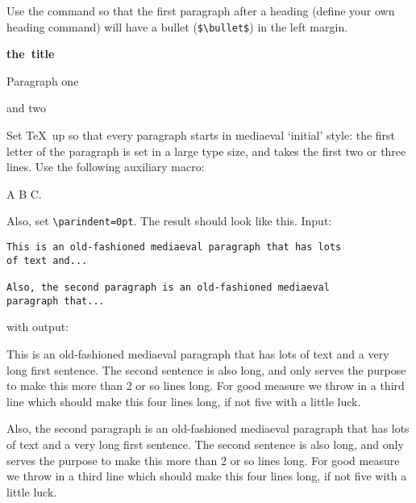 \begin{594exercise}
Use the  command so that the first paragraph after a
heading (define your own heading command) will have a bullet
(\verb+$\bullet$+) in the left margin.
\end{594exercise}
\begin{answer}
\begin{examplewithcode}
\def\Header#1{\medskip
  \hbox{\bfseries #1}
  \setcounter{vcount}{1}
  }
\Header{the title}

Paragraph one

and two
\end{examplewithcode}
\end{answer}


\begin{594exercise}
Set \TeX\ up so that every paragraph starts in mediaeval `initial'
style: the first letter of the paragraph is set in a large type size,
and takes the first two or three lines.
Use the following auxiliary macro:


\begin{examplewithcode}
A \Hang{$\bullet$} B  C. \bigskip
\end{examplewithcode}
Also, set \verb+\parindent=0pt+. The result should look like this. Input:
\begin{verbatim}
This is an old-fashioned mediaeval paragraph that has lots 
of text and...

Also, the second paragraph is an old-fashioned mediaeval
paragraph that...
\end{verbatim}
\smallskip with output:\par\medskip
\begin{minipage}{3in}
\def\biginitial#1{\hskip-20pt \Hang{\huge #1}\hskip 20pt}
\parindent=0pt
\everypar{\hangafter=-2 \hangindent=20pt \biginitial}
This is an old-fashioned mediaeval paragraph that has lots of text and
a very long first sentence. The second sentence is also long, and only
serves the purpose to make this more than 2 or so lines long. For good
measure we throw in a third line which should make this four lines
long, if not five with a little luck.

Also, the second paragraph is an old-fashioned mediaeval paragraph that
has lots of text and a very long first sentence. The second sentence
is also long, and only serves the purpose to make this more than 2 or
so lines long. For good measure we throw in a third line which should
make this four lines long, if not five with a little luck.
\end{minipage}
\end{594exercise}

